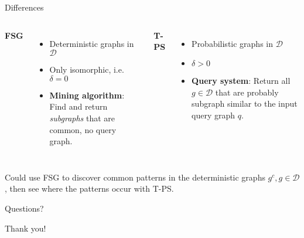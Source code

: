 \documentclass[10pt, aspectratio=149]{beamer}
\begin{document}
\begin{frame}{Differences}
    \begin{columns}[T,onlytextwidth]
    
    \textbf{FSG}
    \begin{itemize}
        \item Deterministic graphs in $\mathcal{D}$
        
        \item Only isomorphic, i.e. $\delta = 0$
        
        \item \textbf{Mining algorithm}: Find and return \textit{subgraphs} that are common, no query graph.
    \end{itemize}
    
    
    \textbf{T-PS}
    \begin{itemize}
        \item Probabilistic graphs in $\mathcal{D}$
        
        \item $\delta > 0$
        
        \item \textbf{Query system}: Return all $g \in \mathcal{D}$ that are probably subgraph similar to the input query graph $q$.
    \end{itemize}
    
    \end{columns}
    
    \vspace{6pt}
    Could use FSG to discover common patterns in the deterministic graphs $g^c, g \in \mathcal{D}$, then see where the patterns occur with T-PS.
\end{frame}


{
\begin{frame}[standout]
  Questions?
\end{frame}
}

{
\begin{frame}[standout]
  Thank you!
\end{frame}
}


\appendix
\end{document}
